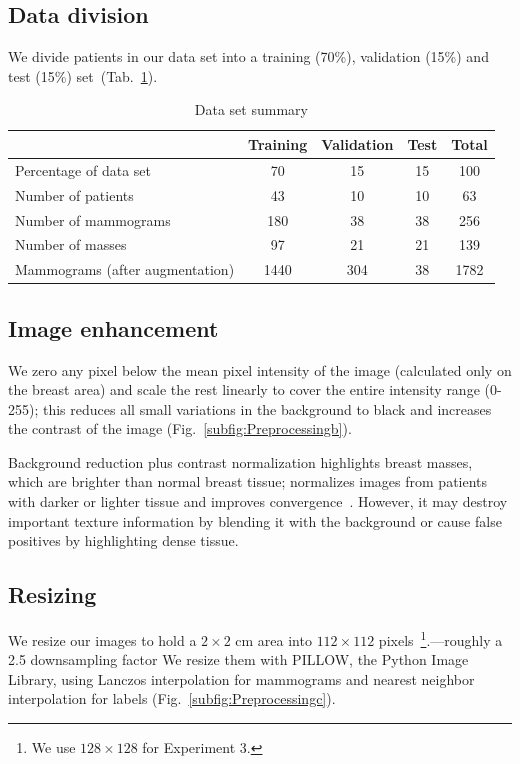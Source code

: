 \subsection{Data division}
We divide patients in our data set into a training (70\%), validation (15\%) and test (15\%) set~(Tab.~\ref{tab:DataSetSummary}).

\begin{table}[h]
	\centering
	\begin{tabular}{lcccc}
		\hline
		&\textbf{Training} & \textbf{Validation} & \textbf{Test} & \textbf{Total}\\
		\hline 
		Percentage of data set	&70		&15	&15	&100\\
		Number of patients		&43		&10	&10	&63\\
		Number of mammograms 	&180	&38	&38	&256\\
		Number of masses 		&97		&21	&21	&139\\
		Mammograms (after augmentation) &1440 &304 &38	&1782\\
		\hline
	\end{tabular}
	\caption[Data set summary]{Data set summary}
	\label{tab:DataSetSummary}
\end{table}

\subsection{Image enhancement}
We zero any pixel below the mean pixel intensity of the image (calculated only on the breast area) and scale the rest linearly to cover the entire intensity range (0-255); this reduces all small variations in the background to black and increases the contrast of the image (Fig.~\ref{subfig:Preprocessingb}).

Background reduction plus contrast normalization highlights breast masses, which are brighter than normal breast tissue; normalizes images from patients with darker or lighter tissue and improves convergence~\cite{Arevalo2016}. However, it may destroy important texture information by blending it with the background or cause false positives by highlighting dense tissue.

\subsection{Resizing}
We resize our images to hold a $2 \times 2$ cm area into $112 \times 112$ pixels~\footnote{We use $128 \times 128$ for Experiment 3.}.---roughly a 2.5 downsampling factor
We resize them with PILLOW, the Python Image Library, using Lanczos interpolation for mammograms and nearest neighbor interpolation for labels (Fig.~\ref{subfig:Preprocessingc}).

